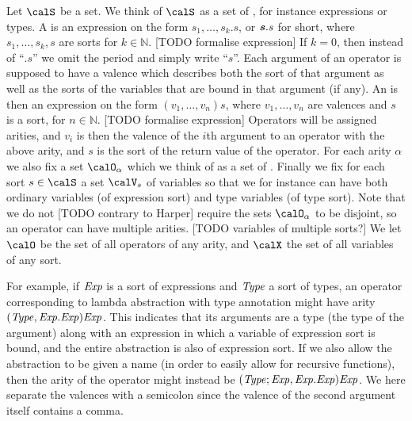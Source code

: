 \documentclass[a4paper, 11pt, article, danish, oneside]{memoir}
\newcommand{\naturals}{\mathbb{N}}
\newcommand{\newpar}{\paragraph{}}
\newcommand{\setVar}{\calV}
\begin{document}
Let $\setSort$ be a set. We think of $\setSort$ as a set of , for instance expressions or types. A  is an expression on the form $s_1,\ldots,s_k.s$, or $\bm{s}.s$ for short, where $s_1,\ldots,s_k,s$ are sorts for $k \in \naturals$. [TODO formalise expression] If $k = 0$, then instead of \enquote{$.s$} we omit the period and simply write \enquote{$s$}. Each argument of an operator is supposed to have a valence which describes both the sort of that argument as well as the sorts of the variables that are bound in that argument (if any). An  is then an expression on the form $(v_1, \ldots, v_n)s$, where $v_1, \ldots, v_n$ are valences and $s$ is a sort, for $n \in \naturals$. [TODO formalise expression] Operators will be assigned arities, and $v_i$ is then the valence of the $i$th argument to an operator with the above arity, and $s$ is the sort of the return value of the operator. For each arity $\alpha$ we also fix a set $\setOp_\alpha$ which we think of as a set of . Finally we fix for each sort $s \in \calS$ a set $\setVar_s$ of variables so that we for instance can have both ordinary variables (of expression sort) and type variables (of type sort). Note that we do not [TODO contrary to Harper] require the sets $\setOp_\alpha$ to be disjoint, so an operator can have multiple arities. [TODO variables of multiple sorts?] We let $\setOp$ be the set of all operators of any arity, and $\calX$ the set of all variables of any sort.

For example, if $\mathit{Exp}$ is a sort of expressions and $\mathit{Type}$ a sort of types, an operator corresponding to lambda abstraction with type annotation might have arity $(\mathit{Type}, \mathit{Exp}.\mathit{Exp})\mathit{Exp}$. This indicates that its arguments are a type (the type of the argument) along with an expression in which a variable of expression sort is bound, and the entire abstraction is also of expression sort. If we also allow the abstraction to be given a name (in order to easily allow for recursive functions), then the arity of the operator might instead be $(\mathit{Type}; \mathit{Exp},\mathit{Exp}.\mathit{Exp})\mathit{Exp}$. We here separate the valences with a semicolon since the valence of the second argument itself contains a comma.


\newpar
\end{document}

